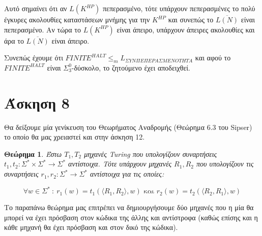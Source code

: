 \documentclass[a4paper, oneside, 11pt]{article}
\newtheorem{thm}{Θεώρημα}
\theoremstyle{definition}
\begin{document}
Αυτό σημαίνει ότι αν $L(K^{HP})$ πεπερασμένο, τότε υπάρχουν πεπερασμένες το πολύ έγκυρες ακολουθίες καταστάσεων μνήμης για την $K^{HP}$ και συνεπώς το $\overline{L(N)}$ είναι
πεπερασμένο. Αν τώρα το $L(K^{HP})$ είναι άπειρο, υπάρχουν άπειρες ακολουθίες και άρα το $\overline{L(N)}$ είναι άπειρο. 

Συνεπώς έχουμε ότι $FINITE^{HALT}\leq_m L_{\Sigma YN\Pi E\Pi EPA\Sigma MENOTHTA}$ και αφού το $FINITE^{HALT}$ είναι $\Sigma_3^0$-δύσκολο, το ζητούμενο έχει αποδειχθεί.

\section*{Άσκηση 8}

Θα δείξουμε μία γενίκευση του Θεωρήματος Αναδρομής (Θεώρημα 6.3 του Sipser) το
οποίο θα μας χρειαστεί και στην άσκηση 12.

\begin{thm}
\label{rec_thm}
Έστω $T_1, T_2$ μηχανές Turing που υπολογίζουν συναρτήσεις $t_1, t_2 : \Sigma^* \times
\Sigma^* \rightarrow \Sigma^*$ αντίστοιχα. Τότε υπάρχουν μηχανές $R_1, R_2$ που
υπολογίζουν τις συναρτήσεις
$r_1, r_2 : \Sigma^* \rightarrow \Sigma^*$ αντίστοιχα για τις οποίες:

\begin{equation*}
   \forall w \in \Sigma^*\ :\ r_1(w) = t_1(\langle R_1, R_2 \rangle, w)
   \text{ και } r_2(w) = t_2(\langle R_2, R_1 \rangle, w)
\end{equation*}
\end{thm}

Το παραπάνω θεώρημα μας επιτρέπει να δημιουργήσουμε δύο μηχανές που η μία θα
μπορεί να έχει πρόσβαση στον κώδικα της άλλης και αντίστροφα (καθώς επίσης και η
κάθε μηχανή θα έχει πρόσβαση και στον δικό της κώδικα).
\end{document}
